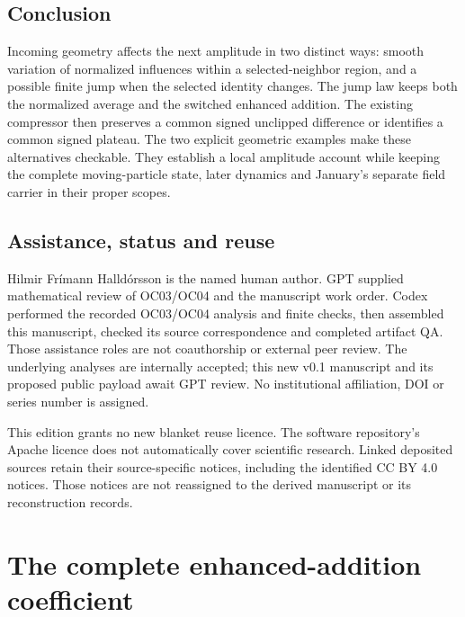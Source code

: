 \documentclass[11pt,a4paper]{article}
\theoremstyle{remark}\newtheorem{remark}[theorem]{Remark}
\numberwithin{equation}{section}
\begin{document}
\subsection*{Conclusion}

Incoming geometry affects the next amplitude in two distinct ways:
smooth variation of normalized influences within a selected-neighbor region,
and a possible finite jump when the selected identity changes.
The jump law keeps both the normalized average and the switched enhanced
addition. The existing compressor then preserves a common signed unclipped
difference or identifies a common signed plateau.
The two explicit geometric examples make these alternatives checkable.
They establish a local amplitude account while keeping the complete
moving-particle state, later dynamics and January's separate field carrier
in their proper scopes.

\subsection*{Assistance, status and reuse}

Hilmir Fr\'imann Halld\'orsson is the named human author.
GPT supplied mathematical review of OC03/OC04 and the manuscript work order.
Codex performed the recorded OC03/OC04 analysis and finite checks, then
assembled this manuscript, checked its source correspondence and completed
artifact QA. Those assistance roles are not coauthorship or external peer
review. The underlying analyses are internally accepted; this new v0.1
manuscript and its proposed public payload await GPT review.
No institutional affiliation, DOI or series number is assigned.

This edition grants no new blanket reuse licence. The software repository's
Apache licence does not automatically cover scientific research.
Linked deposited sources retain their source-specific notices, including
the identified CC BY 4.0 notices. Those notices are not reassigned to the
derived manuscript or its reconstruction records.

\appendix
\section{The complete enhanced-addition coefficient}\label{app:eta}
\end{document}
